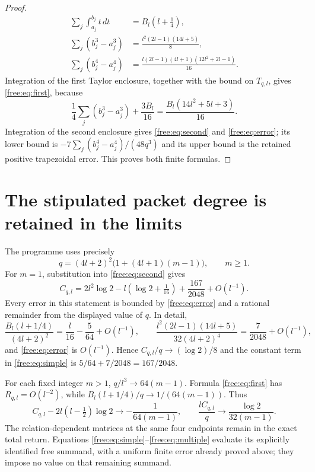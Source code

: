 \begin{proof}
\begin{align*}
 \sum_j\int_{a_j}^{b_j}t\,dt&=B_l(l+\tfrac14),\\
 \sum_j(b_j^3-a_j^3)&=\frac{l^2(2l-1)(14l+5)}8,\\
 \sum_j(b_j^4-a_j^4)&=
       \frac{l(2l-1)(4l+1)(12l^2+2l-1)}{16}.
\end{align*}
Integration of the first Taylor enclosure, together with the bound on
$T_{q,l}$, gives \eqref{free:eq:first}, because
\[
 \frac14\sum_j(b_j^3-a_j^3)+\frac{3B_l}{16}
 =\frac{B_l(14l^2+5l+3)}{16}.
\]
Integration of the second enclosure gives \eqref{free:eq:second} and
\eqref{free:eq:error}; its lower bound is
$-7\sum_j(b_j^4-a_j^4)/(48q^3)$ and its upper bound is the retained
positive trapezoidal error. This proves both finite formulas.
\end{proof}

\section{The stipulated packet degree is retained in the limits}
The programme uses precisely
\[
 q=(4l+2)^2\bigl(1+(4l+1)(m-1)\bigr),\qquad m\ge1.
\]
For $m=1$, substitution into \eqref{free:eq:second} gives
\begin{equation}\label{free:eq:simple}
 C_{q,l}=2l^2\log2-l(\log2+\tfrac1{16})
                 +\frac{167}{2048}+O(l^{-1}).
\end{equation}
Every error in this statement is bounded by \eqref{free:eq:error} and a
rational remainder from the displayed value of $q$. In detail,
\[
 \frac{B_l(l+1/4)}{(4l+2)^2}
 =\frac l{16}-\frac5{64}+O(l^{-1}),\qquad
 \frac{l^2(2l-1)(14l+5)}{32(4l+2)^4}
 =\frac7{2048}+O(l^{-1}),
\]
and \eqref{free:eq:error} is $O(l^{-1})$. Hence $C_{q,l}/q\to(\log2)/8$
and the constant term in \eqref{free:eq:simple} is $5/64+7/2048=167/2048$.

For each fixed integer $m>1$, $q/l^3\to64(m-1)$. Formula
\eqref{free:eq:first} has $R_{q,l}=O(l^{-2})$, while
$B_l(l+1/4)/q\to1/(64(m-1))$. Thus
\begin{equation}\label{free:eq:multiple}
 C_{q,l}-2l(l-\tfrac12)\log2\longrightarrow-\frac1{64(m-1)},
 \qquad
 \frac{lC_{q,l}}q\longrightarrow\frac{\log2}{32(m-1)}.
\end{equation}
The relation-dependent matrices at the same four endpoints remain in
the exact total return. Equations \eqref{free:eq:simple}--\eqref{free:eq:multiple}
evaluate its explicitly identified free summand, with a uniform finite
error already proved above; they impose no value on that remaining
summand.
